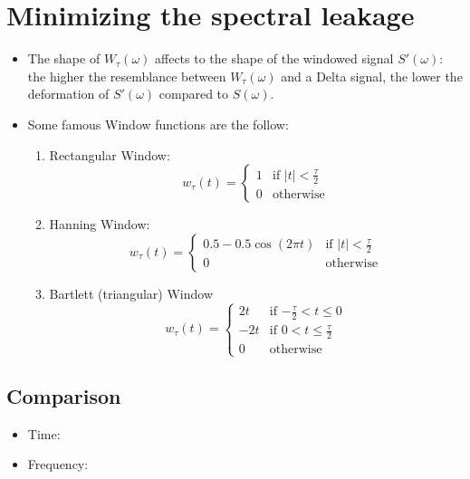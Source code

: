 \section{Minimizing the spectral leakage~\cite{lathi1998modern}}

\begin{itemize}
\item The shape of $W_\tau(\omega)$ affects to the shape of the
  windowed signal $S'(\omega)$: the higher the resemblance between
  $W_\tau(\omega)$ and a Delta signal, the lower the deformation of
  $S'(\omega)$ compared to $S(\omega)$.

\item Some famous Window functions are the follow:
  \begin{enumerate}
  \item Rectangular Window:
    \begin{equation}
      w_\tau(t) =
      \left\{
      \begin{array}{ll}
        1 & \text{if $|t|<\frac{\tau}{2}$}\\
        0 & \text{otherwise}
      \end{array}
      \right.
    \end{equation}

  \item Hanning Window:
    \begin{equation}
      w_\tau(t) =
      \left\{
      \begin{array}{ll}
        0.5-0.5\cos(2\pi t) & \text{if $|t|<\frac{\tau}{2}$}\\
        0 & \text{otherwise}
      \end{array}
      \right.
    \end{equation}

  \item Bartlett (triangular) Window
    \begin{equation}
      w_\tau(t) =
      \left\{
      \begin{array}{ll}
        2t & \text{if $-\frac{\tau}{2}<t\le 0$}\\
        -2t & \text{if $0<t\le \frac{\tau}{2}$}\\
        0 & \text{otherwise}
      \end{array}
      \right.
    \end{equation}
    
  \end{enumerate}
  
\end{itemize}

\subsection*{Comparison}
\begin{itemize}
\item Time:
\item Frequency:
\end{itemize}


